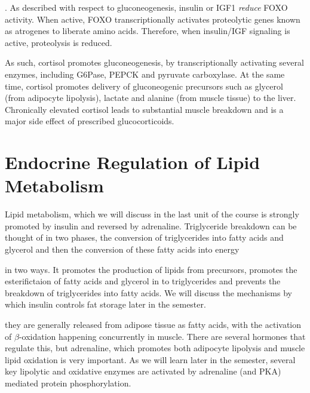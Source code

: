 \documentclass{tufte-handout}
\begin{document}
.  As described with respect to gluconeogenesis, insulin or IGF1 \emph{reduce} FOXO activity.  When active, FOXO transcriptionally activates proteolytic genes known as atrogenes to liberate amino acids.  Therefore, when insulin/IGF signaling is active, proteolysis is reduced. 

  As such, cortisol promotes gluconeogenesis, by transcriptionally activating several enzymes, including G6Pase, PEPCK and pyruvate carboxylase.  At the same time, cortisol promotes delivery of gluconeogenic precursors such as glycerol (from adipocyte lipolysis), lactate and alanine (from muscle tissue) to the liver.  Chronically elevated cortisol leads to substantial muscle breakdown and is a major side effect of prescribed glucocorticoids.

\section{Endocrine Regulation of Lipid Metabolism}

Lipid metabolism, which we will discuss in the last unit of the course is strongly promoted by insulin and reversed by adrenaline.  Triglyceride breakdown can be thought of in two phases, the conversion of triglycerides into fatty acids and glycerol and then the conversion of these fatty acids into energy  

 in two ways.  It promotes the production of lipids from precursors, promotes the esterifictaion of fatty acids and glycerol in to triglycerides and prevents the breakdown of triglycerides into fatty acids.  We will discuss the mechanisms by which insulin controls fat storage later in the semester.

 they are generally released from adipose tissue as fatty acids, with the activation of $\beta$-oxidation happening concurrently in muscle.  There are several hormones that regulate this, but adrenaline, which promotes both adipocyte lipolysis and muscle lipid oxidation is very important.  As we will learn later in the semester, several key lipolytic and oxidative enzymes are activated by adrenaline (and PKA) mediated protein phosphorylation.



\end{document}
